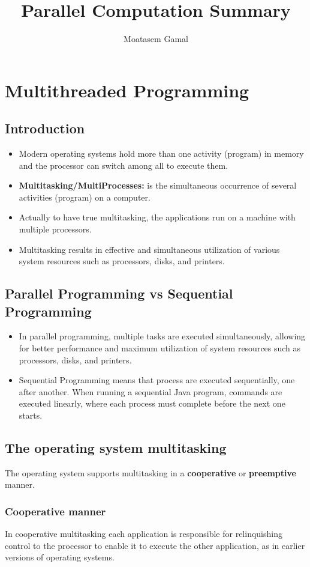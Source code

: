 \documentclass[12pt, a4paper]{book}
\title{Parallel Computation Summary}
\author{Moatasem Gamal}
\affil{FCAI BSU}
\begin{document}
\maketitle
\tableofcontents
\chapter{Multithreaded Programming}
\section{Introduction}
\begin{itemize}
    \item Modern operating systems hold more than one activity (program) in memory and the processor can switch among all to execute them.
    \item \textbf{Multitasking/MultiProcesses:} is the simultaneous occurrence of several activities (program) on a computer.
    \item Actually to have true multitasking, the applications run on a machine with multiple processors.
    \item Multitasking results in effective and simultaneous utilization of various system resources such as processors, disks, and printers.
\end{itemize}
\section{Parallel Programming vs Sequential Programming}
\begin{itemize}
    \item In parallel programming, multiple tasks are executed simultaneously, allowing for better performance and maximum utilization of system resources such as processors, disks, and printers.
    \item Sequential Programming means that process are executed sequentially, one after another. When running a sequential Java program, commands are executed linearly, where each process must complete before the next one starts.
\end{itemize}

\section{The operating system multitasking}
The operating system supports multitasking in a \textbf{cooperative} or \textbf{preemptive} manner.
\subsection{Cooperative manner}
In cooperative multitasking each application is responsible for relinquishing control to the processor to enable it to execute the other application, as in earlier versions of operating systems.
\end{document}
